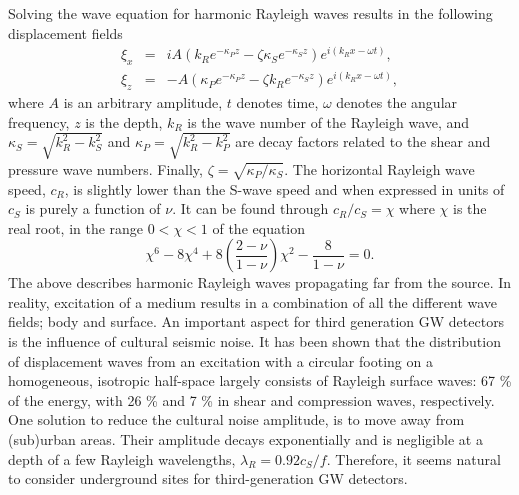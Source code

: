 Solving the wave equation for harmonic Rayleigh waves results in the following displacement fields~\cite{seismic_rayleigh}
\begin{eqnarray}
\xi_x &=& iA(k_R e^{-\kappa_P z}-\zeta \kappa_S e^{-\kappa_S z}) e^{i(k_R x-\omega t)}, \\ \nonumber
\xi_z &=& -A (\kappa_P e^{-\kappa_P z}-\zeta k_R e^{-\kappa_S z})e^{i(k_R x-\omega t)},
\label{eq3.39} 
\end{eqnarray}
where $A$ is an arbitrary amplitude, $t$ denotes time, $\omega$ denotes the angular frequency, $z$ is the depth, $k_R$ is the wave number of the Rayleigh wave, and $\kappa_S=\sqrt{k^2_R-k^2_S}$ and $\kappa_P=\sqrt{k^2_R-k^2_P}$ are decay factors related to the shear and pressure wave numbers. Finally, $\zeta=\sqrt{\kappa_P/\kappa_S}$. The horizontal Rayleigh wave speed, $c_R$, is slightly lower than the S-wave speed and when expressed in units of $c_S$ is purely a function of $\nu$.  It can be found through $c_R/c_S = \chi$ where $\chi$ is the real root, in the range $0 < \chi < 1$ of the equation~\cite{seismic_rayleigh}
\begin{equation}
	\chi^6 -8\chi^4 + 8\left(\frac{2-\nu}{1-\nu}\right)\chi^2 - \frac{8}{1-\nu}=0.
	\label{eq3.40}
\end{equation}
The above describes harmonic Rayleigh waves propagating far from the source. In reality, excitation of a medium results in a combination of all the different wave fields; body and surface.
An important aspect for third generation GW detectors is the influence of cultural seismic noise. It has been shown \cite{WoodsASCE} that the distribution of displacement waves from an excitation with a circular footing on a homogeneous, isotropic half-space largely consists of Rayleigh surface waves: 67 \% of the energy, with 26 \% and 7 \% in shear and compression waves, respectively. One solution to reduce the cultural noise amplitude, is to move away from (sub)urban areas. Their amplitude decays exponentially and is negligible at a depth of a few Rayleigh wavelengths, $\lambda_R = 0.92 c_S/f$. Therefore, it seems natural to consider underground sites for third-generation GW detectors.
